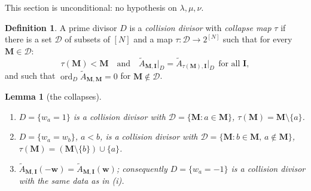 \documentclass[11pt]{article}
\theoremstyle{plain}
\newtheorem{lem}[thm]{Lemma}
\theoremstyle{definition}
\newtheorem{defn}[thm]{Definition}
\theoremstyle{remark}
\theoremstyle{plain}
\newcommand{\bI}{\mathbf{I}}
\newcommand{\bM}{\mathbf{M}}
\newcommand{\bw}{\mathbf{w}}
\newcommand{\At}{\widetilde{A}}
\newcommand{\ord}{\operatorname{ord}}
\begin{document}
This section is unconditional: no hypothesis on $\lambda,\mu,\nu$.

\begin{defn}
A prime divisor $D$ is a \emph{collision divisor} with \emph{collapse map}
$\tau$ if there is a set $\mathcal{D}$ of subsets of $[N]$ and a map
$\tau:\mathcal{D}\to2^{[N]}$ such that for every $\bM\in\mathcal{D}$:
\begin{equation}
\tau(\bM)<\bM
\quad\text{and}\quad
\At_{\bM,\bI}\big|_{D}=\At_{\tau(\bM),\bI}\big|_{D}\ \ \text{for all }\bI,
\label{eq:collapse}
\end{equation}
and such that $\ord_D\At_{\bM,\bM}=0$ for $\bM\notin\mathcal{D}$.
\end{defn}

\begin{lem}[the collapses]\label{lem:collapse}
\begin{enumerate}
\item[(i)] $D=\{w_a=1\}$ is a collision divisor with
$\mathcal{D}=\{\bM:a\in\bM\}$, $\tau(\bM)=\bM\setminus\{a\}$.
\item[(ii)] $D=\{w_a=w_b\}$, $a<b$, is a collision divisor with
$\mathcal{D}=\{\bM:b\in\bM,\,a\notin\bM\}$,
$\tau(\bM)=(\bM\setminus\{b\})\cup\{a\}$.
\item[(iii)] $\At_{\bM,\bI}(-\bw)=\At_{\bM,\bI}(\bw)$; consequently
$D=\{w_a=-1\}$ is a collision divisor with the same data as in (i).
\end{enumerate}
\end{lem}
\end{document}
